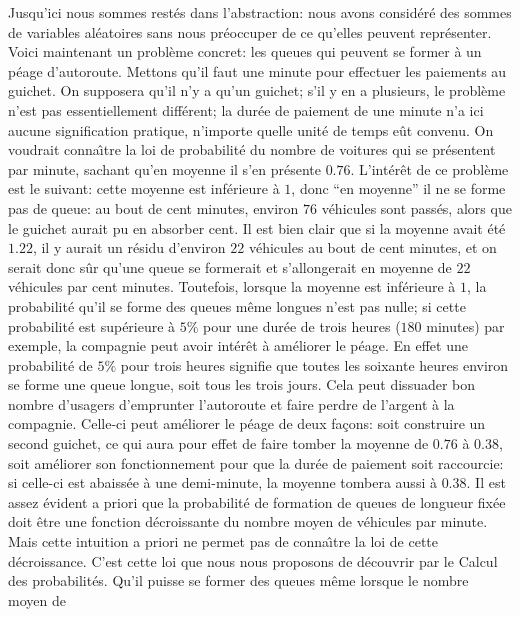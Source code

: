 Jusqu'ici nous sommes rest\'es dans l'abstraction:  nous avons  
consid\'er\'e des sommes de variables al\'eatoires sans nous  
pr\'eoccuper de ce qu'elles peuvent repr\'esenter. 
\medskip 
Voici maintenant un probl\`eme concret:  les queues qui peuvent se 
former \`a un p\'eage d'autoroute.  Mettons qu'il faut une minute pour 
effectuer les paiements au guichet.  On supposera qu'il n'y a qu'un guichet; 
s'il y en a plusieurs,  le probl\`eme n'est pas essentiellement diff\'erent;  
la dur\'ee de paiement de une minute n'a ici aucune signification pratique,  
n'importe quelle unit\'e de temps e\^ut convenu.  On voudrait conna{\^\i}tre  
la loi de proba\-bilit\'e du nombre de voitures qui se pr\'esentent par 
minute,  sachant qu'en moyenne il s'en pr\'esente $0.76$.  L'int\'er\^et
de ce probl\`eme est le suivant:  cette moyenne est inf\'erieure \`a $1$, 
donc ``en moyenne'' il ne se forme pas de queue:  au bout de cent minutes, 
environ $76$ v\'ehicules sont pass\'es,  alors que le guichet aurait pu en
absorber cent.  Il est bien clair que si la moyenne avait \'et\'e $1.22$, 
il y aurait un r\'esidu d'environ $22$ v\'ehicules au bout de cent minutes, 
et on serait donc s\^ur qu'une queue se formerait et s'allongerait en
moyenne de $22$ v\'ehicules par cent minutes.  Toutefois,  lorsque la
moyenne est inf\'erieure \`a $1$,  la probabilit\'e qu'il se forme des
queues m\^eme longues n'est pas nulle;  si cette probabilit\'e est
sup\'erieure \`a $5\%$ pour une dur\'ee de trois heures ($180$ minutes)
par exemple,  la compagnie peut avoir int\'er\^et \`a am\'eliorer le p\'eage. 
En effet une probabilit\'e de $5\%$ pour trois heures signifie que toutes
les soixante heures environ se forme une queue longue,  soit tous les trois
jours.  Cela peut dissuader bon nombre d'usagers d'emprunter l'autoroute
et faire perdre de l'argent \`a la compagnie.  Celle-ci peut am\'eliorer
le p\'eage de deux fa\c{c}ons:  soit construire un second guichet,  ce qui
aura pour effet de faire tomber la moyenne de $0.76$ \`a $0.38$,  soit
am\'eliorer son fonctionnement pour que la dur\'ee de paiement soit
raccourcie:  si celle-ci est abaiss\'ee \`a une demi-minute,  la moyenne
tombera aussi \`a $0.38$.  Il est assez \'evident a priori que la
probabilit\'e de formation de queues de longueur fix\'ee doit \^etre
une fonction d\'ecroissante du nombre moyen de v\'ehicules par minute. 
Mais cette intuition a priori ne permet pas de conna{\^\i}tre la loi
de cette d\'ecroissance.  C'est cette loi que nous nous proposons de
d\'ecouvrir par le Calcul des probabilit\'es. 
\medskip 
Qu'il puisse se former des queues m\^eme lorsque le nombre moyen de 
